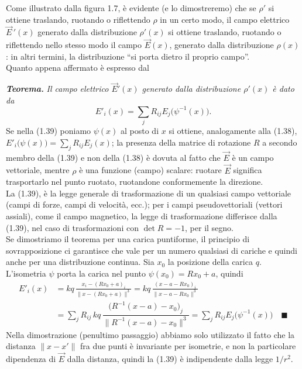 Come illustrato dalla figura 1.7, è evidente (e lo dimostreremo) che se $\rho'$ si ottiene traslando, ruotando o riflettendo $\rho$ in un certo modo, il campo elettrico $\vec E\,'(x)$ generato dalla distribuzione $\rho'(x)$ si ottiene traslando, ruotando o riflettendo nello stesso modo il campo $\vec E(x)$, generato dalla distribuzione $\rho(x)$: in altri termini, la distribuzione ``si porta dietro il proprio campo''.\\
Quanto appena affermato è espresso dal

\textbf{\textit{Teorema.}} \textit{Il campo elettrico $\vec E'(x)$ generato dalla distribuzione $\rho'(x)$ è dato da}
\begin{equation}
E'_i(x)=\textstyle\sum_j R_{ij}E_j\big(\psi^{-1}(x)\big).
\tag{1.39}
\end{equation}
Se nella (1.39) poniamo $\psi(x)$ al posto di $x$ si ottiene, analogamente alla (1.38), $E'_i\big(\psi(x)\big)=\sum_jR_{ij}E_j(x)$; la presenza della matrice di rotazione $R$ a secondo membro della (1.39) e non della (1.38) è dovuta al fatto che $\vec E$ è un campo vettoriale, mentre $\rho$ è una funzione (campo) scalare: ruotare $\vec E$ significa trasportarlo nel punto ruotato, ruotandone conformemente la direzione.\\
La (1.39), è la legge generale di trasformazione di un qualsiasi campo vettoriale (campi di forze, campi di velocità, ecc.); per i campi pseudovettoriali (vettori assiali), come il campo magnetico, la legge di trasformazione differisce dalla (1.39), nel caso di trasformazioni con $\det R=-1$, per il segno.\\
Se dimostriamo il teorema per una carica puntiforme, il principio di sovrapposizione ci garantisce che vale per un numero qualsiasi di cariche e quindi anche per una distribuzione continua. Sia $x_0$ la posizione della carica $q$. L'isometria $\psi$ porta la carica nel punto $\psi(x_0)=Rx_0+a$, quindi
\begin{equation}
\begin{split}
E'_i(x)&=kq\,\frac{x_i-(Rx_0+a)_i}{\|x-(Rx_0+a)\|^3}=kq\,\frac{(x-a-Rx_0)_i}{\|x-a-Rx_0\|^3}\\
&=\textstyle\sum_jR_{ij}\,kq\,\dfrac{\big(R^{-1}(x-a)-x_0\big)_j}{\|R^{-1}(x-a)-x_0\|^3}=\sum_jR_{ij}E_j\big(\psi^{-1}(x)\big)\quad\blacksquare
\end{split}
\tag{1.40}
\end{equation}
Nella dimostrazione (penultimo passaggio) abbiamo solo utilizzato il fatto che la distanza $\|x-x'\|$ fra due punti è invariante per isometrie, e non la particolare dipendenza di $\vec E$ dalla distanza, quindi la (1.39) è indipendente dalla legge $1/r^2$.

